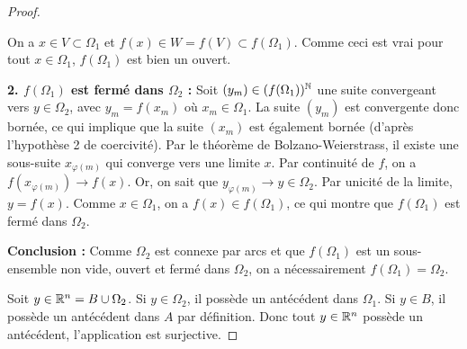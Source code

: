 \begin{proof}
    \begin{center}
    \end{center}

    On a $x \in V \subset \Omega_1$ et $f(x) \in W = f(V) \subset f(\Omega_1)$.
    Comme ceci est vrai pour tout $x \in \Omega_1$, $f(\Omega_1)$ est bien un ouvert.

    \textbf{2. $f(\Omega_1)$ est fermé dans $\Omega_2$ :}
    Soit $(y_m) \in (f(\Omega_1))^{\mathbb{N}}$ une suite convergeant vers $y \in \Omega_2$, avec $y_m = f(x_m)$ où $x_m \in \Omega_1$.
    La suite $(y_m)$ est convergente donc bornée, ce qui implique que la suite $(x_m)$ est également bornée (d'après l'hypothèse 2 de coercivité).
    Par le théorème de Bolzano-Weierstrass, il existe une sous-suite $x_{\varphi(m)}$ qui converge vers une limite $x$.
    Par continuité de $f$, on a $f(x_{\varphi(m)}) \to f(x)$.
    Or, on sait que $y_{\varphi(m)} \to y \in \Omega_2$. Par unicité de la limite, $y = f(x)$.
    Comme $x \in \Omega_1$, on a $f(x) \in f(\Omega_1)$, ce qui montre que $f(\Omega_1)$ est fermé dans $\Omega_2$.

    \lvspace
    \textbf{Conclusion :}
    Comme $\Omega_2$ est connexe par arcs et que $f(\Omega_1)$ est un sous-ensemble non vide, ouvert et fermé dans $\Omega_2$, on a nécessairement $f(\Omega_1) = \Omega_2$.
    
    Soit $y \in \mathbb{R}^n = B \cup \Omega_2$. 
    Si $y \in \Omega_2$, il possède un antécédent dans $\Omega_1$. Si $y \in B$, il possède un antécédent dans $A$ par définition. 
    Donc tout $y \in \mathbb{R}^n$ possède un antécédent, l'application est surjective.
\end{proof}